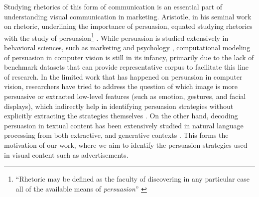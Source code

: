 Studying rhetorics of this form of communication is an essential part of understanding visual communication in marketing. Aristotle, in his seminal work on rhetoric, underlining the importance of persuasion, equated studying rhetorics with the study of persuasion\footnote{``Rhetoric may be defined as the faculty of discovering in any particular case all of the available means of \textit{persuasion}'' \cite{rapp2002aristotle}} \cite{rapp2002aristotle}. While persuasion is studied extensively in behavioral sciences, such as marketing \cite{meyers1999consumers,keller2003affect} and psychology \cite{hovland1953communication,petty1986elaboration}, computational modeling of persuasion in computer vision is still in its infancy, primarily due to the lack of benchmark datasets that can provide representative corpus to facilitate this line of research. In the limited work that has happened on persuasion in computer vision, researchers have tried to address the question of which image is more persuasive \cite{bai2021m2p2} or extracted low-level features (such as emotion, gestures, and facial displays), which indirectly help in identifying persuasion strategies without explicitly extracting the strategies themselves \cite{joo2014visual}. On the other hand, decoding persuasion in textual content has been extensively studied in natural language processing from both extractive, and generative contexts \cite{habernal2016makes,ChenYang2021,luu2019measuring}. This forms the motivation of our work, where we aim to identify the persuasion strategies used in visual content such as advertisements.









